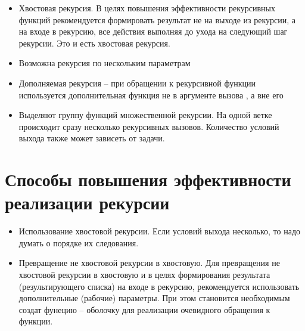\begin{itemize}
    \item Хвостовая рекурсия. В целях повышения эффективности рекурсивных
        функций рекомендуется формировать результат не на выходе из рекурсии,
        а на входе в рекурсию, все действия выполняя до ухода на следующий шаг
        рекурсии. Это и есть хвостовая рекурсия.
    \item Возможна рекурсия по нескольким параметрам
    \item Дополняемая рекурсия -- при обращении к рекурсивной функции
        используется дополнительная функция не в аргументе вызова , а вне его
    \item Выделяют группу функций множественной рекурсии. На одной
        ветке происходит сразу несколько рекурсивных вызовов. Количество
        условий выхода также может зависеть от задачи.
\end{itemize}

\section{Способы повышения эффективности реализации рекурсии}

\begin{itemize}
    \item Использование хвостовой рекурсии.
        Если условий выхода несколько, то надо думать о порядке их следования.
    \item Превращение не хвостовой рекурсии в хвостовую.
        Для превращения не хвостовой рекурсии в хвостовую и в целях
        формирования результата (результирующего списка) на входе в
        рекурсию, рекомендуется использовать дополнительные (рабочие)
        параметры. При этом становится необходимым создат фунецию --
        оболочку для реализации очевидного обращения к функции.
\end{itemize}
